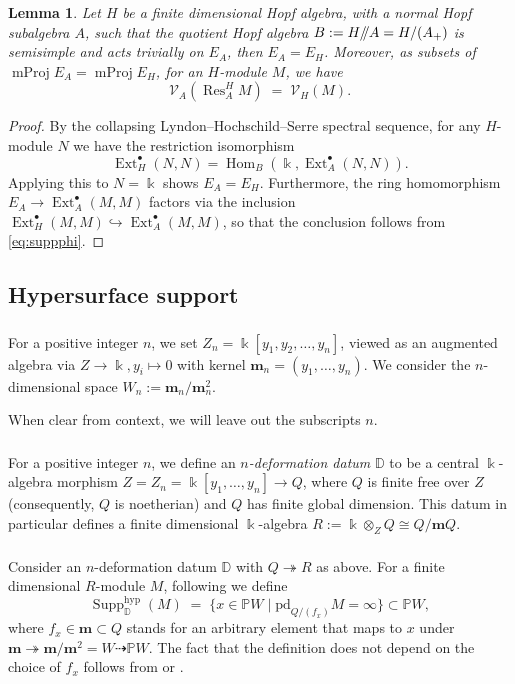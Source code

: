 \documentclass{amsart}
\numberwithin{equation}{section}
\newtheorem{lemma}[subsubsection]{Lemma}
\theoremstyle{definition}
\theoremstyle{remark}
\newcommand{\bk}{\Bbbk}
\newcommand{\Res}{\operatorname{Res}}
\newcommand{\hyp}{\mathrm{hyp}}
\newcommand{\pd}{\mathrm{pd}}
\newcommand{\Hom}{\operatorname{Hom}}
\newcommand{\tto}{\twoheadrightarrow}
\newcommand{\Ext}{\operatorname{Ext}}
\newcommand{\Supp}{\operatorname{Supp}}
\newcommand{\mProj}{\operatorname{mProj}}
\newcommand{\fm}{\mathbf{m}}
\newcommand{\cV}{\mathcal{V}}
\newcommand{\mD}{\mathbb{D}}
\newcommand{\mP}{\mathbb{P}}
\begin{document}
\begin{lemma}\label{lem:Hopfnormal}
Let $H$ be a finite dimensional Hopf algebra, with a normal Hopf subalgebra $A$, such that the quotient Hopf algebra $B:=H/\hspace{-1mm}/A= H/(A_+)$ is semisimple and acts trivially on $E_{A}$, then $E_A=E_H$. Moreover, as subsets of $\mProj E_A=\mProj E_H$, for an $H$-module $M$, we have
\[\cV_A(\Res^H_AM)\;=\; \cV_H(M).\]
\end{lemma}
\begin{proof}
By the collapsing Lyndon–Hochschild–Serre spectral sequence, for any $H$-module $N$ we have the restriction isomorphism
\[\Ext^\bullet_H(N,N)=\Hom_{B}(\bk,\Ext^\bullet_A(N,N)).\]
Applying this to $N=\bk$ shows $E_A=E_H$. Furthermore, the ring homomorphism $E_A\to\Ext^\bullet_A(M,M)$ factors via the inclusion $\Ext^\bullet_H(M,M)\hookrightarrow \Ext^\bullet_A(M,M)$, so that the conclusion follows from \eqref{eq:suppphi}.
\end{proof}

\subsection{Hypersurface support}\label{sec:hyper}

\subsubsection{} For a positive integer $n$, we set $Z_n=\bk[y_1,y_2,\ldots, y_n]$, viewed as an augmented algebra via $Z\to\bk, y_i\mapsto 0$ with kernel $\fm_n=(y_1,\ldots, y_n)$. We consider the $n$-dimensional space $W_n:=\fm_n/\fm_n^2$.


 When clear from context, we will leave out the subscripts $n$.

\subsubsection{}\label{def:datum} For a positive integer $n$, we define an \emph{$n$-deformation datum} $\mD$ to be a central $\bk$-algebra morphism $Z=Z_n=\bk[y_1,\ldots, y_n]\to Q$, where $Q$ is finite free over $Z$ (consequently, $Q$ is noetherian) and $Q$ has finite global dimension. This datum in particular defines a finite dimensional $\bk$-algebra $R:=\bk\otimes_{Z}Q\cong Q/\fm Q$. 




\subsubsection{}\label{def:hyper} Consider an $n$-deformation datum $\mD$ with $Q\tto R$ as above. For a finite dimensional $R$-module $M$, following \cite{NP1, NP2} we define
\[\Supp^{\hyp}_{\mD}(M)\;=\;\{x\in\mP W\mid \pd_{Q/(f_x)}M=\infty\}\subset\mP W,\]
where $f_x\in\fm\subset Q$ stands for an arbitrary element that maps to $x$ under $\fm\tto\fm/\fm^2=W\dashrightarrow\mP W$. The fact that the definition does not depend on the choice of $f_x$ follows from  \cite[Corollary~5.5]{NP1} or \cite[Corollary~5.3]{NP2}.
\end{document}
